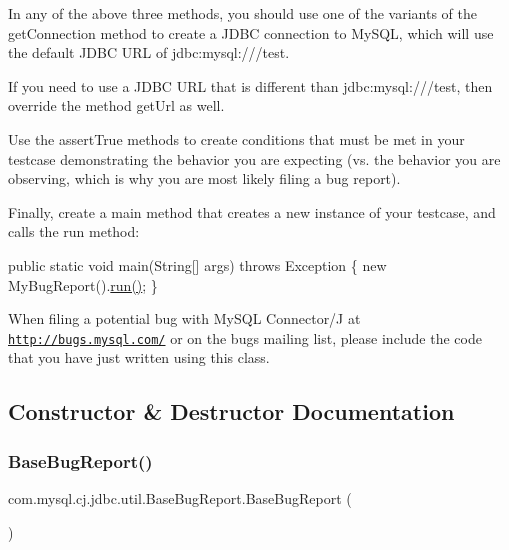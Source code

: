 In any of the above three methods, you should use one of the variants of the \textquotesingle{}get\+Connection\textquotesingle{} method to create a J\+D\+BC connection to My\+S\+QL, which will use the default J\+D\+BC U\+RL of \textquotesingle{}jdbc\+:mysql\+:///test\textquotesingle{}.

If you need to use a J\+D\+BC U\+RL that is different than \textquotesingle{}jdbc\+:mysql\+:///test\textquotesingle{}, then override the method \textquotesingle{}get\+Url\textquotesingle{} as well.

Use the \textquotesingle{}assert\+True\textquotesingle{} methods to create conditions that must be met in your testcase demonstrating the behavior you are expecting (vs. the behavior you are observing, which is why you are most likely filing a bug report).

Finally, create a \textquotesingle{}main\textquotesingle{} method that creates a new instance of your testcase, and calls the \textquotesingle{}run\textquotesingle{} method\+:


\begin{DoxyPre}
public static void main(String[] args) throws Exception \{
    new MyBugReport().\mbox{\hyperlink{classcom_1_1mysql_1_1cj_1_1jdbc_1_1util_1_1_base_bug_report_aa9c59d5f6ff687784bd96bebd5e3dc87}{run()}};
\}
\end{DoxyPre}


When filing a potential bug with My\+S\+QL Connector/J at \href{http://bugs.mysql.com/}{\tt http\+://bugs.\+mysql.\+com/} or on the bugs mailing list, please include the code that you have just written using this class. 

\subsection{Constructor \& Destructor Documentation}
\mbox{\label{classcom_1_1mysql_1_1cj_1_1jdbc_1_1util_1_1_base_bug_report_ab1f1c9976f81472afdb89476bf540830}} 
\subsubsection{\texorpdfstring{Base\+Bug\+Report()}{BaseBugReport()}}
{\footnotesize\ttfamily com.\+mysql.\+cj.\+jdbc.\+util.\+Base\+Bug\+Report.\+Base\+Bug\+Report (\begin{DoxyParamCaption}{ }\end{DoxyParamCaption})}

